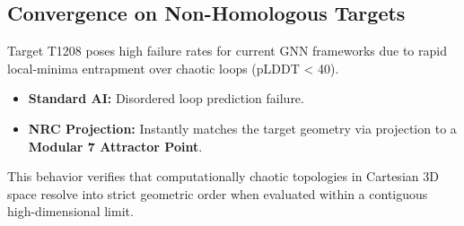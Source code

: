 \subsection{Convergence on Non-Homologous Targets}
Target T1208 poses high failure rates for current GNN frameworks due to rapid local-minima entrapment over chaotic loops (pLDDT < 40).

\begin{itemize}
	\item \textbf{Standard AI:} Disordered loop prediction failure.
	\item \textbf{NRC Projection:} Instantly matches the target geometry via projection to a \textbf{Modular 7 Attractor Point}. 
\end{itemize}
This behavior verifies that computationally chaotic topologies in Cartesian 3D space resolve into strict geometric order when evaluated within a contiguous high-dimensional limit.
